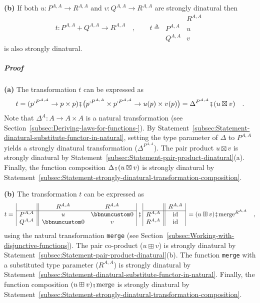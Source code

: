 \textbf{(b)} If both $u:P^{A,A}\rightarrow R^{A,A}$ and $v:Q^{A,A}\rightarrow R^{A,A}$
are strongly dinatural then
\[
t:P^{A,A}+Q^{A,A}\rightarrow R^{A,A}\quad,\quad\quad t\triangleq\,\begin{array}{|c||c|}
 & R^{A,A}\\
\hline P^{A,A} & u\\
Q^{A,A} & v
\end{array}
\]
is also strongly dinatural.

\subparagraph{Proof}

\textbf{(a)} The transformation $t$ can be expressed as
\[
t=(p^{:P^{A,A}}\rightarrow p\times p)\bef\big(p^{:P^{A,A}}\times p^{:P^{A,A}}\rightarrow u(p)\times v(p)\big)=\Delta^{P^{A,A}}\bef(u\boxtimes v)\quad.
\]
Note that $\Delta^{A}:A\rightarrow A\times A$ is a natural transformation
(see Section~\ref{subsec:Deriving-laws-for-functions-}). By Statement~\ref{subsec:Statement-dinatural-substitute-functor-in-natural},
setting the type parameter of $\Delta$ to $P^{A,A}$ yields a strongly
dinatural transformation ($\Delta^{P^{A,A}}$). The pair product $u\boxtimes v$
is strongly dinatural by Statement~\ref{subsec:Statement-pair-product-dinatural}(a).
Finally, the function composition $\Delta\bef(u\boxtimes v)$ is strongly
dinatural by Statement~\ref{subsec:Statement-strongly-dinatural-transformation-composition}.

\textbf{(b)} The transformation $t$ can be expressed as
\[
t=\,\begin{array}{|c||cc|}
 & R^{A,A} & R^{A,A}\\
\hline P^{A,A} & u & \bbnum 0\\
Q^{A,A} & \bbnum 0 & v
\end{array}\,\bef\,\begin{array}{|c||c|}
 & R^{A,A}\\
\hline R^{A,A} & \text{id}\\
R^{A,A} & \text{id}
\end{array}\,=(u\boxplus v)\bef\text{merge}^{R^{A,A}}\quad,
\]
using the natural transformation \lstinline!merge! (see Section~\ref{subsec:Working-with-disjunctive-functions}).
The pair co-product ($u\boxplus v$) is strongly dinatural by Statement~\ref{subsec:Statement-pair-product-dinatural}(b).
The function \lstinline!merge! with a substituted type parameter
($R^{A,A}$) is strongly dinatural by Statement~\ref{subsec:Statement-dinatural-substitute-functor-in-natural}.
Finally, the function composition $(u\boxplus v)\bef\text{merge}$
is strongly dinatural by Statement~\ref{subsec:Statement-strongly-dinatural-transformation-composition}.

